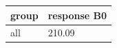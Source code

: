 \begingroup\small
\setlength{\tabcolsep}{3pt}
\renewcommand{\arraystretch}{1.04}
\begin{tabularx}{\linewidth}{XX}
\toprule
group & response B0 \\
\midrule
all & 210.09 \\
\bottomrule
\end{tabularx}
\endgroup

